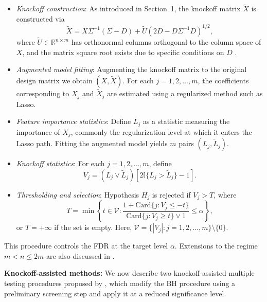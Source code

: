 \documentclass[11pt]{article}
\numberwithin{equation}{section}
\theoremstyle{plain}
\theoremstyle{remark}
\begin{document}
\begin{itemize}
    \item \textit{Knockoff construction}: As introduced in Section~1, the knockoff matrix \(\tilde{X}\) is constructed via
    \[
    \tilde{X} = X \Sigma^{-1} (\Sigma - D) + \tilde{U} (2D - D\Sigma^{-1} D)^{1/2},
    \]
    where \(\tilde{U} \in \mathbb{R}^{n \times m}\) has orthonormal columns orthogonal to the column space of \(X\), and the matrix square root exists due to specific conditions on \(D\) \citep{barber2015controlling}.

    \item \textit{Augmented model fitting}: Augmenting the knockoff matrix to the original design matrix we obtain $(X,\tilde{X})$. For each \(j = 1, 2, \ldots, m\), the coefficients corresponding to \(X_j\) and \(\tilde{X}_j\) are estimated using a regularized method such as Lasso.

    \item \textit{Feature importance statistics}: Define \(L_j\) as a statistic measuring the importance of \(X_j\), commonly the regularization level at which it enters the Lasso path. Fitting the augmented model yields \(m\) pairs \((L_j, \tilde{L}_j)\).

    \item \textit{Knockoff statistics}: For each \(j = 1, 2, \ldots, m\), define
    \[
    V_j = (L_j \vee \tilde{L}_j)\left[2\mathbb{I}\{L_j > \tilde{L}_j\} - 1\right].
    \]

    \item \textit{Thresholding and selection}: Hypothesis \(H_j\) is rejected if \(V_j > T\), where
    \[
    T = \min\left\{t \in \mathcal{V} : \frac{1 + \text{Card}\{j : V_j \leq -t\}}{\text{Card}\{j : V_j \geq t\} \vee 1} \leq \alpha \right\},
    \]
    or \(T = +\infty\) if the set is empty. Here, \(\mathcal{V} = \{|V_j| : j = 1, 2, \ldots, m\} \setminus \{0\}\).
\end{itemize}
This procedure controls the FDR at the target level \(\alpha\). Extensions to the regime \(m < n \leq 2m\) are also discussed in \citet{barber2015controlling}.

\textbf{Knockoff-assisted methods:} We now describe two knockoff-assisted multiple testing procedures proposed by \citet{sarkar2022adjusting}, which modify the BH procedure using a preliminary screening step and apply it at a reduced significance level.
\end{document}
